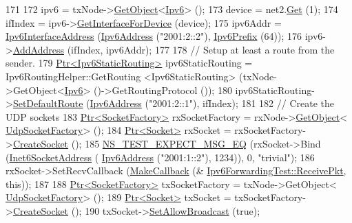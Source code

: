 \begin{DoxyCode}
171 
172   ipv6 = txNode->\hyperlink{classns3_1_1Object_a13e18c00017096c8381eb651d5bd0783}{GetObject}<\hyperlink{classns3_1_1Ipv6}{Ipv6}> ();
173   device = net2.\hyperlink{classns3_1_1NetDeviceContainer_a677d62594b5c9d2dea155cc5045f4d0b}{Get} (1);
174   ifIndex = ipv6->\hyperlink{classns3_1_1Ipv6_a3337dc6ce66612b0fa9b57f7f0338745}{GetInterfaceForDevice} (device);
175   ipv6Addr = \hyperlink{classns3_1_1Ipv6InterfaceAddress}{Ipv6InterfaceAddress} (\hyperlink{classns3_1_1Ipv6Address}{Ipv6Address} (\textcolor{stringliteral}{"2001:2::2"}), 
      \hyperlink{classns3_1_1Ipv6Prefix}{Ipv6Prefix} (64));
176   ipv6->\hyperlink{classns3_1_1Ipv6_a5cd576e83cf65445be3a0b5ffd1ddc5c}{AddAddress} (ifIndex, ipv6Addr);
177 
178   \textcolor{comment}{// Setup at least a route from the sender.}
179   \hyperlink{classns3_1_1Ptr}{Ptr<Ipv6StaticRouting>} ipv6StaticRouting = Ipv6RoutingHelper::GetRouting
       <Ipv6StaticRouting> (txNode->GetObject<\hyperlink{classns3_1_1Ipv6}{Ipv6}> ()->GetRoutingProtocol ());
180   ipv6StaticRouting->\hyperlink{classns3_1_1Ipv6StaticRouting_af80ab0c9c95ea4bbc004bda7ce1cae06}{SetDefaultRoute} (\hyperlink{classns3_1_1Ipv6Address}{Ipv6Address} (\textcolor{stringliteral}{"2001:2::1"}), ifIndex);
181 
182   \textcolor{comment}{// Create the UDP sockets}
183   \hyperlink{classns3_1_1Ptr}{Ptr<SocketFactory>} rxSocketFactory = rxNode->\hyperlink{classns3_1_1Object_a13e18c00017096c8381eb651d5bd0783}{GetObject}<
      \hyperlink{classns3_1_1UdpSocketFactory}{UdpSocketFactory}> ();
184   \hyperlink{classns3_1_1Ptr}{Ptr<Socket>} rxSocket = rxSocketFactory->\hyperlink{classns3_1_1SocketFactory_a97351e6e7860503a4912042530449f62}{CreateSocket} ();
185   \hyperlink{group__testing_ga7304ba46a28d8cf08dfdfd6499cf7068}{NS\_TEST\_EXPECT\_MSG\_EQ} (rxSocket->Bind (\hyperlink{classns3_1_1Inet6SocketAddress}{Inet6SocketAddress} (
      \hyperlink{classns3_1_1Ipv6Address}{Ipv6Address} (\textcolor{stringliteral}{"2001:1::2"}), 1234)), 0, \textcolor{stringliteral}{"trivial"});
186   rxSocket->SetRecvCallback (\hyperlink{group__makecallbackmemptr_ga9376283685aa99d204048d6a4b7610a4}{MakeCallback} (&
      \hyperlink{classIpv6ForwardingTest_af07be239d02a6e300f27d6892e4d2480}{Ipv6ForwardingTest::ReceivePkt}, \textcolor{keyword}{this}));
187 
188   \hyperlink{classns3_1_1Ptr}{Ptr<SocketFactory>} txSocketFactory = txNode->GetObject<
      \hyperlink{classns3_1_1UdpSocketFactory}{UdpSocketFactory}> ();
189   \hyperlink{classns3_1_1Ptr}{Ptr<Socket>} txSocket = txSocketFactory->\hyperlink{classns3_1_1SocketFactory_a97351e6e7860503a4912042530449f62}{CreateSocket} ();
190   txSocket->\hyperlink{classns3_1_1Socket_a32b4fa27b732a63207c8d9054a817ed5}{SetAllowBroadcast} (\textcolor{keyword}{true});

\end{DoxyCode}
